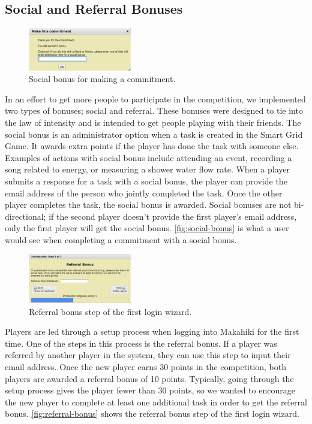 \subsection{Social and Referral Bonuses}
\label{makahiki:components-bonuses}

\begin{figure}[h]
  \center
  \includegraphics[width=0.4\textwidth]{images/social-bonus.eps}
  \caption{Social bonus for making a commitment.}
  \label{fig:social-bonus}
\end{figure}

In an effort to get more people to participate in the competition, we implemented two types of bonuses; social and referral. These bonuses were designed to tie into the law of intensity and is intended to get people playing with their friends. The social bonus is an administrator option when a task is created in the Smart Grid Game. It awards extra points if the player has done the task with someone else. Examples of actions with social bonus include attending an event, recording a song related to energy, or measuring a shower water flow rate. When a player submits a response for a task with a social bonus, the player can provide the email address of the person who jointly completed the task. Once the other player completes the task, the social bonus is awarded. Social bonuses are not bi-directional; if the second player doesn't provide the first player's email address, only the first player will get the social bonus. \autoref{fig:social-bonus} is what a user would see when completing a commitment with a social bonus.

\begin{figure}[h]
  \center
  \includegraphics[width=0.4\textwidth]{images/referral-bonus.eps}
  \caption{Referral bonus step of the first login wizard.}
  \label{fig:referral-bonus}
\end{figure}

Players are led through a setup process when logging into Makahiki for the first time. One of the steps in this process is the referral bonus. If a player was referred by another player in the system, they can use this step to input their email address. Once the new player earns 30 points in the competition, both players are awarded a referral bonus of 10 points. Typically, going through the setup process gives the player fewer than 30 points, so we wanted to encourage the new player to complete at least one additional task in order to get the referral bonus. \autoref{fig:referral-bonus} shows the referral bonus step of the first login wizard.

